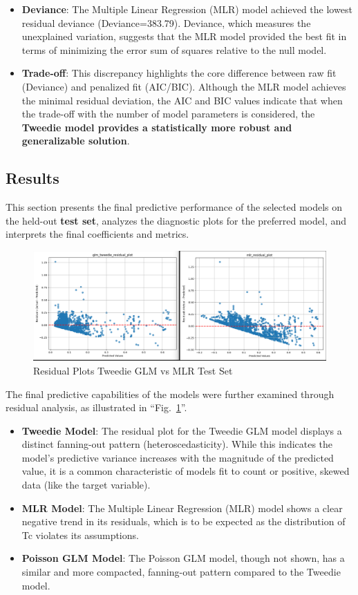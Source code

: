 \documentclass[conference]{IEEEtran}
\begin{document}
\begin{itemize}
	\item \textbf{Deviance}: The Multiple Linear Regression (MLR) model achieved the lowest residual deviance (Deviance=383.79). Deviance, which measures the unexplained variation, suggests that the MLR model provided the best fit in terms of minimizing the error sum of squares relative to the null model.
	\item \textbf{Trade-off}: This discrepancy highlights the core difference between raw fit (Deviance) and penalized fit (AIC/BIC). Although the MLR model achieves the minimal residual deviation, the AIC and BIC values indicate that when the trade-off with the number of model parameters is considered, the \textbf{Tweedie model provides a statistically more robust and generalizable solution}.
\end{itemize}

\subsection{\textbf{Results}}
This section presents the final predictive performance of the selected models on the held-out \textbf{test set}, analyzes the diagnostic plots for the preferred model, and interprets the final coefficients and metrics.
\begin{figure}[htbp]
	\centerline{\includegraphics[scale=0.2]{residual_plots_mlr_vs_tweedie_test.png}}
	\caption{Residual Plots Tweedie GLM vs MLR Test Set}
	\label{test_residual_plot}
\end{figure}

The final predictive capabilities of the models were further examined through residual analysis, as illustrated in ``Fig.~\ref{test_residual_plot}''.
\begin{itemize}
	\item \textbf{Tweedie Model}: The residual plot for the Tweedie GLM model displays a distinct fanning-out pattern (heteroscedasticity). While this indicates the model's predictive variance increases with the magnitude of the predicted value, it is a common characteristic of models fit to count or positive, skewed data (like the target variable).
	\item \textbf{MLR Model}: The Multiple Linear Regression (MLR) model shows a clear negative trend in its residuals, which is to be expected as the distribution of Tc violates its assumptions.
	\item \textbf{Poisson GLM Model}: The Poisson GLM model, though not shown, has a similar and more compacted, fanning-out pattern compared to the Tweedie model.\\
\end{itemize}
\end{document}
